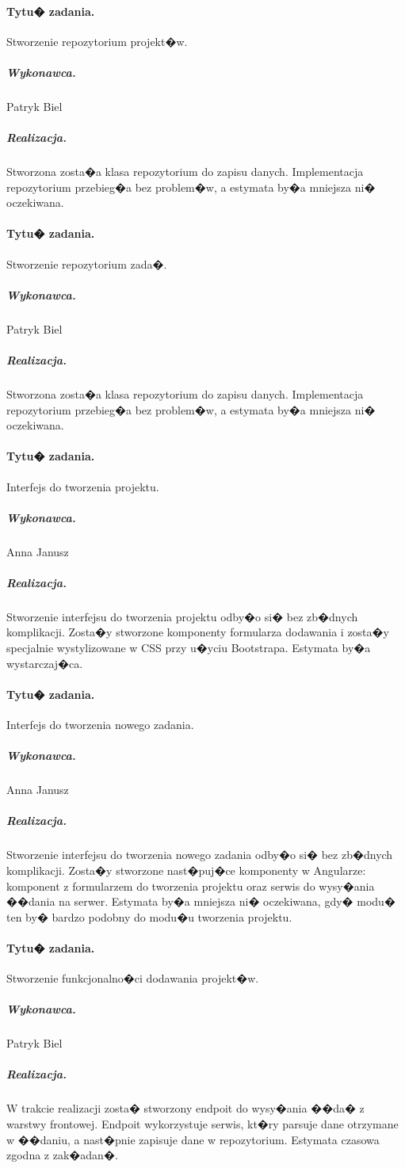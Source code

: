 ﻿\documentclass[a4paper]{article}
\begin{document}
\paragraph{Tytu� zadania.} Stworzenie repozytorium projekt�w.
\subparagraph{Wykonawca.} Patryk Biel
\subparagraph{Realizacja.} Stworzona zosta�a klasa repozytorium do zapisu danych. Implementacja repozytorium przebieg�a bez problem�w, a estymata by�a mniejsza ni� oczekiwana.

\paragraph{Tytu� zadania.}  Stworzenie repozytorium zada�.
\subparagraph{Wykonawca.} Patryk Biel
\subparagraph{Realizacja.} Stworzona zosta�a klasa repozytorium do zapisu danych. Implementacja repozytorium przebieg�a bez problem�w, a estymata by�a mniejsza ni� oczekiwana.

\paragraph{Tytu� zadania.}Interfejs do tworzenia projektu.
\subparagraph{Wykonawca.} Anna Janusz
\subparagraph{Realizacja.} Stworzenie interfejsu do tworzenia projektu odby�o si� bez zb�dnych komplikacji. Zosta�y stworzone komponenty formularza dodawania i zosta�y specjalnie wystylizowane w CSS przy u�yciu Bootstrapa. Estymata by�a wystarczaj�ca.

\paragraph{Tytu� zadania.} Interfejs do tworzenia nowego zadania.
\subparagraph{Wykonawca.} Anna Janusz
\subparagraph{Realizacja.}  Stworzenie interfejsu do tworzenia nowego zadania odby�o si� bez zb�dnych komplikacji. Zosta�y stworzone nast�puj�ce komponenty w Angularze: komponent z formularzem do tworzenia projektu oraz serwis do wysy�ania ��dania na serwer. Estymata by�a mniejsza ni� oczekiwana, gdy� modu� ten by� bardzo podobny do modu�u tworzenia projektu.

\paragraph{Tytu� zadania.} Stworzenie funkcjonalno�ci dodawania projekt�w.
\subparagraph{Wykonawca.} Patryk Biel
\subparagraph{Realizacja.}  W trakcie realizacji zosta� stworzony endpoit do wysy�ania ��da� z warstwy frontowej. 
Endpoit wykorzystuje serwis, kt�ry parsuje dane otrzymane w ��daniu, a nast�pnie zapisuje dane w repozytorium. Estymata czasowa zgodna z zak�adan�.
\end{document}
